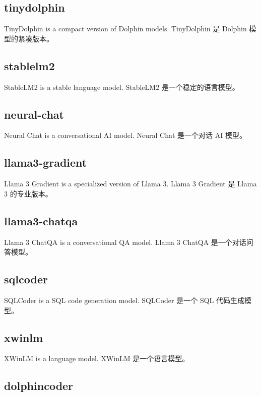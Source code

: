 \documentclass[12pt,UTF8]{ctexbook}
\begin{document}
\subsection{tinydolphin}

TinyDolphin is a compact version of Dolphin models.
TinyDolphin 是 Dolphin 模型的紧凑版本。

\subsection{stablelm2}

StableLM2 is a stable language model.
StableLM2 是一个稳定的语言模型。

\subsection{neural-chat}

Neural Chat is a conversational AI model.
Neural Chat 是一个对话 AI 模型。

\subsection{llama3-gradient}

Llama 3 Gradient is a specialized version of Llama 3.
Llama 3 Gradient 是 Llama 3 的专业版本。

\subsection{llama3-chatqa}

Llama 3 ChatQA is a conversational QA model.
Llama 3 ChatQA 是一个对话问答模型。

\subsection{sqlcoder}

SQLCoder is a SQL code generation model.
SQLCoder 是一个 SQL 代码生成模型。

\subsection{xwinlm}

XWinLM is a language model.
XWinLM 是一个语言模型。

\subsection{dolphincoder}
\end{document}
